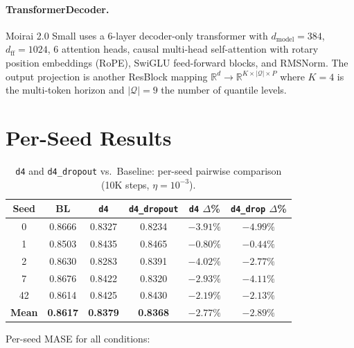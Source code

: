 \documentclass{article}
\begin{document}
\paragraph{TransformerDecoder.} Moirai 2.0 Small uses a 6-layer decoder-only transformer with $d_{\mathrm{model}} = 384$, $d_{\mathrm{ff}} = 1024$, 6 attention heads, causal multi-head self-attention with rotary position embeddings (RoPE), SwiGLU feed-forward blocks, and RMSNorm. The output projection is another ResBlock mapping $\mathbb{R}^d \to \mathbb{R}^{K \times |\mathcal{Q}| \times P}$ where $K{=}4$ is the multi-token horizon and $|\mathcal{Q}|{=}9$ the number of quantile levels.

\section{Per-Seed Results}
\label{app:seeds}

\begin{table}[H]
\centering
\caption{\texttt{d4} and \texttt{d4\_dropout} vs.\ Baseline: per-seed pairwise comparison (10K steps, $\eta = 10^{-3}$).}
\small
\begin{tabular}{cccccc}
\toprule
\textbf{Seed} & \textbf{BL} & \textbf{\texttt{d4}} & \textbf{\texttt{d4\_dropout}} & \textbf{\texttt{d4} $\Delta$\%} & \textbf{\texttt{d4\_drop} $\Delta$\%} \\
\midrule
0 & 0.8666 & 0.8327 & 0.8234 & $-3.91\%$ & $-4.99\%$ \\
1 & 0.8503 & 0.8435 & 0.8465 & $-0.80\%$ & $-0.44\%$ \\
2 & 0.8630 & 0.8283 & 0.8391 & $-4.02\%$ & $-2.77\%$ \\
7 & 0.8676 & 0.8422 & 0.8320 & $-2.93\%$ & $-4.11\%$ \\
42 & 0.8614 & 0.8425 & 0.8430 & $-2.19\%$ & $-2.13\%$ \\
\midrule
\textbf{Mean} & \textbf{0.8617} & \textbf{0.8379} & \textbf{0.8368} & \textbf{$-2.77\%$} & \textbf{$-2.89\%$} \\
\bottomrule
\end{tabular}
\end{table}

Per-seed MASE for all conditions:
\end{document}
